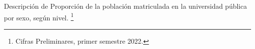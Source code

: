 Descripción de Proporción de la población matriculada en la universidad pública por sexo, según nivel. \footnote{Cifras Preliminares, primer semestre 2022.}